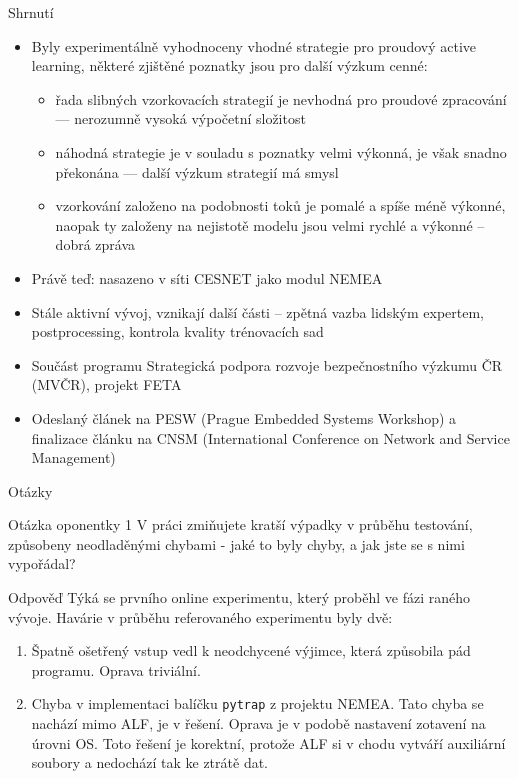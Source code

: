\documentclass{beamer}
\begin{document}
\begin{frame}{Shrnutí}
\begin{itemize}
        \item Byly experimentálně vyhodnoceny vhodné strategie pro proudový active learning, některé zjištěné poznatky jsou pro další výzkum cenné:
        \begin{itemize}
            \item řada slibných vzorkovacích strategií je nevhodná pro proudové zpracování --- nerozumně vysoká výpočetní složitost
            \item náhodná strategie je v souladu s poznatky velmi výkonná, je však snadno překonána --- další výzkum strategií má smysl
            \item vzorkování založeno na podobnosti toků je pomalé a spíše méně výkonné, naopak ty založeny na nejistotě modelu jsou velmi rychlé a výkonné -- dobrá zpráva
        \end{itemize}
    \item Právě teď: nasazeno v síti CESNET jako modul NEMEA
    \item Stále aktivní vývoj, vznikají další části -- zpětná vazba lidským expertem, postprocessing, kontrola kvality trénovacích sad
    \item Součást programu Strategická podpora rozvoje bezpečnostního výzkumu ČR (MVČR), projekt FETA    
    \item Odeslaný článek na PESW (Prague Embedded Systems Workshop) a finalizace článku na CNSM (International Conference on Network and Service Management)


\end{itemize}
\end{frame}

\begin{frame}{Otázky}
\begin{block}{Otázka oponentky 1}
V práci zmiňujete kratší výpadky v průběhu testování, způsobeny neodladěnými chybami - jaké to byly chyby, a jak jste se s nimi vypořádal?
\end{block}

\begin{exampleblock}{Odpověď}
Týká se prvního online experimentu, který proběhl ve fázi raného vývoje. Havárie v průběhu referovaného experimentu byly dvě:
\begin{enumerate}
    \item Špatně ošetřený vstup vedl k neodchycené výjimce, která způsobila pád programu. Oprava triviální.
    \item Chyba v implementaci balíčku \texttt{pytrap} z projektu NEMEA. Tato chyba se nachází mimo ALF, je v řešení. Oprava je v podobě nastavení zotavení na úrovni OS. Toto řešení je korektní, protože ALF si v chodu vytváří auxiliární soubory a nedochází tak ke ztrátě dat.
\end{enumerate}
\end{exampleblock}
\end{frame}
\end{document}
